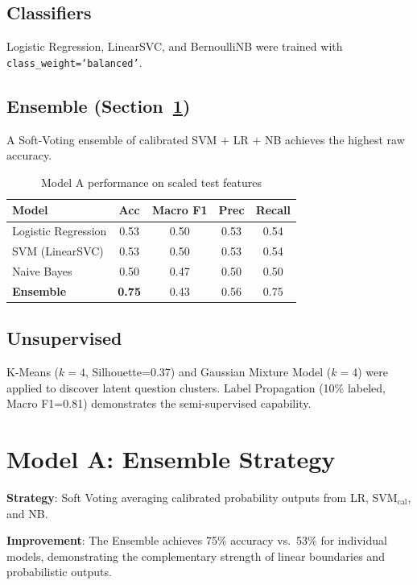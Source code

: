 \documentclass[10pt,twocolumn]{article}
\begin{document}
\subsection*{Classifiers}
Logistic Regression, LinearSVC, and BernoulliNB were trained with \texttt{class\_weight=`balanced'}.

\subsection*{Ensemble (Section~\ref{sec:ensemble})}
A Soft-Voting ensemble of calibrated SVM $+$ LR $+$ NB achieves the highest raw accuracy.

\begin{table}[h]
\centering
\begin{tabular}{@{}lcccc@{}}
\toprule
Model & Acc & Macro F1 & Prec & Recall \\ \midrule
Logistic Regression & 0.53 & 0.50 & 0.53 & 0.54 \\
SVM (LinearSVC) & 0.53 & 0.50 & 0.53 & 0.54 \\
Naive Bayes & 0.50 & 0.47 & 0.50 & 0.50 \\
\textbf{Ensemble} & \textbf{0.75} & 0.43 & 0.56 & 0.75 \\ \bottomrule
\end{tabular}
\caption{Model A performance on scaled test features}
\end{table}

\subsection*{Unsupervised}
K-Means ($k=4$, Silhouette=0.37) and Gaussian Mixture Model ($k=4$) were applied to discover latent question clusters. Label Propagation (10\% labeled, Macro F1=0.81) demonstrates the semi-supervised capability.

\section{Model A: Ensemble Strategy}
\label{sec:ensemble}
\textbf{Strategy}: Soft Voting averaging calibrated probability outputs from LR, SVM$_{\text{cal}}$, and NB.

\textbf{Improvement}: The Ensemble achieves 75\% accuracy vs.\ 53\% for individual models, demonstrating the complementary strength of linear boundaries and probabilistic outputs.

\end{document}
